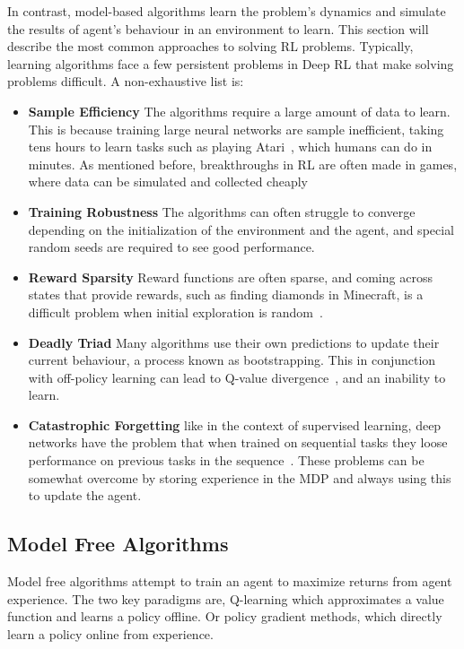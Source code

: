In contrast, model-based algorithms learn the problem's dynamics and simulate the results of agent's behaviour in an environment to learn. This section will describe the most common approaches to solving RL problems.
Typically, learning algorithms face a few persistent problems in Deep RL that make solving problems difficult. A non-exhaustive list is:
\begin{itemize}
	\item \textbf{Sample Efficiency} The algorithms require a large amount of data to learn. This is because training large neural networks are sample inefficient, taking tens hours to learn tasks such as playing Atari~\cite{hessel2018rainbow}, which humans can do in minutes. As mentioned before, breakthroughs in RL are often made in games, where data can be simulated and collected cheaply\cite{dulac2019challenges}
	\item \textbf{Training Robustness} The algorithms can often struggle to converge depending on the initialization of the environment and the agent, and special random seeds are required to see good performance\cite{henderson2018deep}.
	\item \textbf{Reward Sparsity} Reward functions are often sparse, and coming across states that provide rewards, such as finding diamonds in Minecraft, is a difficult problem when initial exploration is random~\cite{hafner2023mastering}.
	\item \textbf{Deadly Triad} Many algorithms use their own predictions to update their current behaviour, a process known as bootstrapping. This in conjunction with off-policy learning can lead to Q-value divergence~\cite{van2018deep}, and an inability to learn.
	\item \textbf{Catastrophic Forgetting} like in the context of supervised learning, deep networks have the problem that when trained on sequential tasks they loose performance on previous tasks in the sequence~\cite{kirkpatrick2017overcoming}. These problems can be somewhat overcome by storing experience in the MDP and always using this to update the agent.

\end{itemize}



\subsection{Model Free Algorithms}
Model free algorithms attempt to train an agent to maximize returns from agent experience. The two key paradigms are, Q-learning which approximates a value function and learns a policy offline. Or policy gradient methods, which directly learn a policy online from experience.

